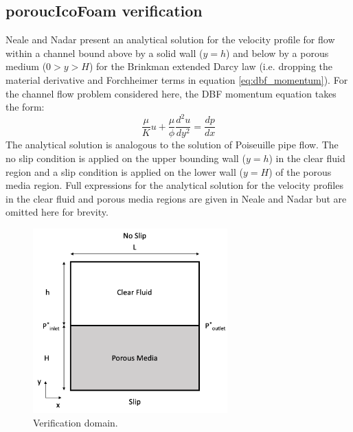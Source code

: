 \documentclass[a4paper,11pt]{report}
\begin{document}
\subsection{poroucIcoFoam verification}
Neale and Nadar \cite{NealeNadar1974} present an analytical solution for the velocity profile for flow within a channel bound above by a solid wall ($y=h$) and below by a porous medium ($0>y>H$) for the Brinkman extended Darcy law (i.e. dropping the material derivative and Forchheimer terms in equation \ref{eq:dbf_momentum}). For the channel flow problem considered here, the DBF momentum equation takes the form:
\begin{equation}
    \frac{\mu}{K}u + \frac{\mu}{\phi}\frac{d^2u}{dy^2} = \frac{dp}{dx}
    \label{eq:channel_dbf_momentum}
\end{equation}
The analytical solution is analogous to the solution of Poiseuille pipe flow. The no slip condition is applied on the upper bounding wall ($y=h$) in the clear fluid region and a slip condition is applied on the lower wall ($y=H$) of the porous media region. Full expressions for the analytical solution for the velocity profiles in the clear fluid and porous media regions are given in Neale and Nadar \cite{NealeNadar1974} but are omitted here for brevity.
\begin{figure}[ht]
    \centering
    \includegraphics[width=75mm]{"verificationDomain.png"}
    \caption{Verification domain.}
\end{figure}\\
\end{document}
